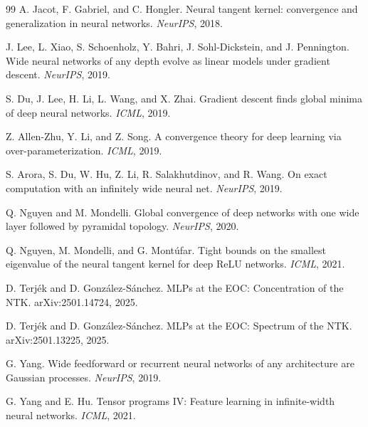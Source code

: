 \documentclass{article}
\begin{document}
\clearpage
\begin{thebibliography}{99}
A. Jacot, F. Gabriel, and C. Hongler.
\newblock Neural tangent kernel: convergence and generalization in neural networks.
\newblock \emph{NeurIPS}, 2018.

J. Lee, L. Xiao, S. Schoenholz, Y. Bahri, J. Sohl-Dickstein, and J. Pennington.
\newblock Wide neural networks of any depth evolve as linear models under gradient descent.
\newblock \emph{NeurIPS}, 2019.

S. Du, J. Lee, H. Li, L. Wang, and X. Zhai.
\newblock Gradient descent finds global minima of deep neural networks.
\newblock \emph{ICML}, 2019.

Z. Allen-Zhu, Y. Li, and Z. Song.
\newblock A convergence theory for deep learning via over-parameterization.
\newblock \emph{ICML}, 2019.

S. Arora, S. Du, W. Hu, Z. Li, R. Salakhutdinov, and R. Wang.
\newblock On exact computation with an infinitely wide neural net.
\newblock \emph{NeurIPS}, 2019.

Q. Nguyen and M. Mondelli.
\newblock Global convergence of deep networks with one wide layer followed by pyramidal topology.
\newblock \emph{NeurIPS}, 2020.

Q. Nguyen, M. Mondelli, and G. Montúfar.
\newblock Tight bounds on the smallest eigenvalue of the neural tangent kernel for deep ReLU networks.
\newblock \emph{ICML}, 2021.

D. Terjék and D. González-Sánchez.
\newblock MLPs at the EOC: Concentration of the NTK.
\newblock arXiv:2501.14724, 2025.

D. Terjék and D. González-Sánchez.
\newblock MLPs at the EOC: Spectrum of the NTK.
\newblock arXiv:2501.13225, 2025.

G. Yang.
\newblock Wide feedforward or recurrent neural networks of any architecture are Gaussian processes.
\newblock \emph{NeurIPS}, 2019.

G. Yang and E. Hu.
\newblock Tensor programs IV: Feature learning in infinite-width neural networks.
\newblock \emph{ICML}, 2021.


\end{thebibliography}
\end{document}

